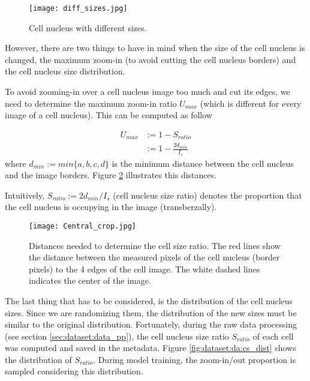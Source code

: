 \begin{figure}[htb]
  \centering
  \texttt{[image: diff\_sizes.jpg]}
  \caption{Cell nucleus with different sizes.}
  \label{fig:dataset:da:diff_size}
\end{figure}

However, there are two things to have in mind when the size of the cell nucleus is changed, the maximum zoom-in (to avoid cutting the cell nucleus borders) and the cell nucleus size distribution.

To avoid zooming-in over a cell nucleus image too much and cut its edges, we need to determine the maximum zoom-in ratio $U_{max}$ (which is different for every image of a  cell nucleus). This can be computed as follow

\begin{equation}
  \begin{split}
    U_{max} &:= 1 - S_{ratio} \\
    &:= 1 - \frac{2 d_{min}}{I_s}
  \end{split}
\end{equation}
\noindent where $d_{min}:=min\{a, b, c, d\}$ is the minimum distance between the cell nucleus and the image borders. Figure \ref{fig:dataset:da:crop} illustrates this distances.

Intuitively, $S_{ratio}:=2 d_{min} / I_s$ (cell nucleus size ratio) denotes the proportion that the cell nucleus is occupying in the image (transberzally).

\begin{figure}[htb]
  \centering
  \texttt{[image: Central\_crop.jpg]}
  \caption{Distances needed to determine the cell size ratio. The red lines show the distance between the measured pixels of the cell nucleus (border pixels) to the 4 edges of the cell image. The white dashed lines indicates the center of the image.}
  \label{fig:dataset:da:crop}
\end{figure}

The last thing that has to be considered, is the distribution of the cell nucleus sizes. Since we are randomizing them, the distribution of the new sizes must be similar to the original distribution. Fortunately, during the raw data processing (see section \ref{sec:dataset:data_pp}), the cell nucleus size ratio $S_{ratio}$ of each cell was computed and saved in the metadata. Figure \ref{fig:dataset:da:cs_dist} shows the distribution of $S_{ratio}$. During model training, the zoom-in/out proportion is sampled considering this distribution.

